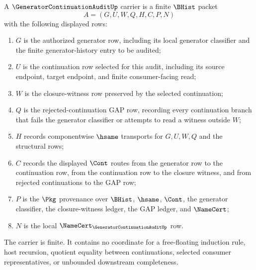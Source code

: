\begin{definition}
\label{def:generator-continuation-audit-carrier}
A $\GeneratorContinuationAuditUp$ carrier is a finite $\BHist$ packet
$$
A=(G,U,W,Q,H,C,P,N)
$$
with the following displayed rows:
\begin{enumerate}
\item $G$ is the authorized generator row, including its local generator classifier and the finite generator-history entry to be audited;
\item $U$ is the continuation row selected for this audit, including its source endpoint, target endpoint, and finite consumer-facing read;
\item $W$ is the closure-witness row preserved by the selected continuation;
\item $Q$ is the rejected-continuation GAP row, recording every continuation branch that fails the generator classifier or attempts to read a witness outside $W$;
\item $H$ records componentwise $\hsame$ transports for $G,U,W,Q$ and the structural rows;
\item $C$ records the displayed $\Cont$ routes from the generator row to the continuation row, from the continuation row to the closure witness, and from rejected continuations to the GAP row;
\item $P$ is the $\Pkg$ provenance over $\BHist$, $\hsame$, $\Cont$, the generator classifier, the closure-witness ledger, the GAP ledger, and $\NameCert$;
\item $N$ is the local $\NameCert_{\GeneratorContinuationAuditUp}$ row.
\end{enumerate}
The carrier is finite. It contains no coordinate for a free-floating induction rule, host recursion, quotient equality between continuations, selected consumer representatives, or unbounded downstream completeness.
\end{definition}

